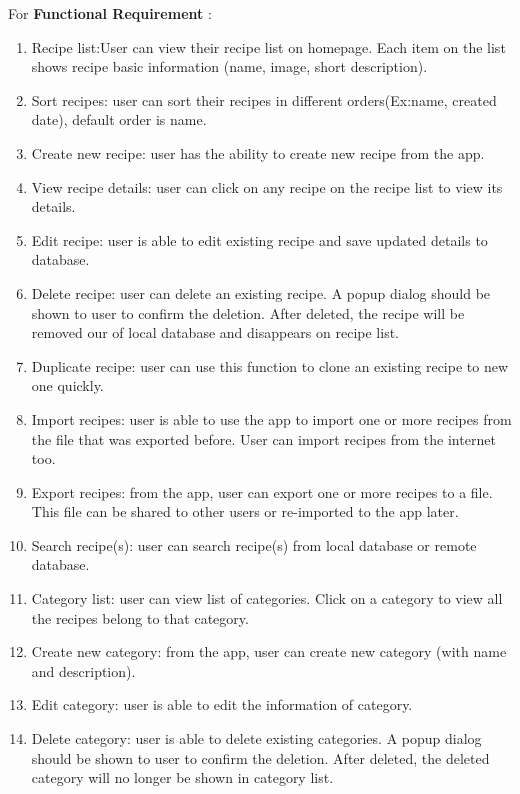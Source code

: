 \documentclass{article}
\begin{document}
    For \textbf{ Functional Requirement} :   \\
    \begin{enumerate}
        \item  Recipe list:User can view their recipe list on homepage. Each item on the list shows recipe basic information (name, image, short description). \\
        \item Sort recipes: user can sort their recipes in different orders(Ex:name, created date), default order is name. 
        \item Create new recipe: user has the ability to create new recipe from the app.
        \item View recipe details: user can click on any recipe on the recipe list to view its details.
        \item Edit recipe: user is able to edit existing recipe and save updated details to database.
        \item Delete recipe: user can delete an existing recipe. A popup dialog should be shown to user to confirm the deletion. After deleted, the recipe will be removed our of local database and disappears on recipe list.
        \item  Duplicate recipe: user can use this function to clone an existing recipe to new one quickly.
        \item Import recipes: user is able to use the app to import one or more recipes from the file that was exported before. User can import recipes from the internet too.
        \item Export recipes: from the app, user can export one or more recipes to a file. This file can be shared to other users or re-imported to the app later.
        \item Search recipe(s): user can search recipe(s) from local database or remote database.
        \item Category list: user can view list of categories. Click on a category to view all the recipes belong to that category.
        \item Create new category: from the app, user can create new category (with name and description).
        \item Edit category: user is able to edit the information of category.
        \item Delete category: user is able to delete existing categories. A popup dialog should be shown to user to confirm the deletion. After deleted, the deleted category will no longer be shown in category list.

\end{enumerate}
\end{document}
